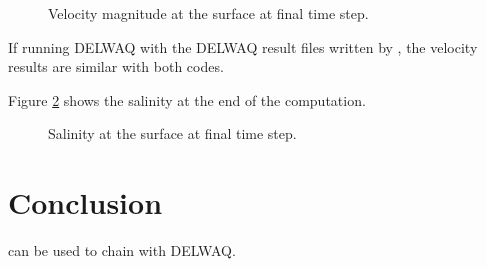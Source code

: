 \begin{figure}[H]
  \centering
  \caption{Velocity magnitude at the surface at final time step.}
  \label{t2d:delwaq:Velo}
\end{figure}

If running DELWAQ with the DELWAQ result files written by , the
velocity results are similar with both codes.

Figure \ref{t2d:delwaq:Salinity} shows the salinity at the end of the
computation.

\begin{figure}[H]
  \centering
  \caption{Salinity at the surface at final time step.}
  \label{t2d:delwaq:Salinity}
\end{figure}

\section{Conclusion}

 can be used to chain with DELWAQ.
